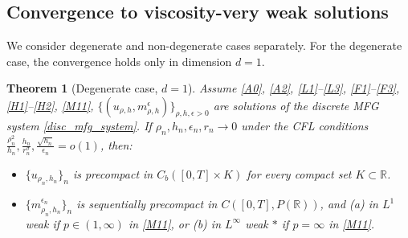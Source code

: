 \documentclass[a4paper,  twoside, 10pt, leqno]{amsart}
\newcommand{\R}{\mathbb{R}}
\newtheorem{thm}{Theorem}[section]
\theoremstyle{remark}
\theoremstyle{definition}
\begin{document}
\subsection{Convergence to viscosity-very weak solutions}

We consider degenerate and non-degenerate cases separately. For the degenerate case, the convergence holds only in dimension $d=1$.  


\begin{thm}[Degenerate case, $d=1$]\label{thm:convergence_MFG}
Assume \ref{A0}, \ref{A2}, \ref{L1}--\ref{L3}, \ref{F1}--\ref{F3}, 
\ref{H1}--\ref{H2}, \ref{M11}, $\{(u_{\rho,h}, m^{\epsilon}_{\rho,h})\}_{\rho,h,\epsilon>0}$ are  solutions of the discrete MFG system
\eqref{disc_mfg_system}. If $\rho_n,h_n,\epsilon_n,r_n\to 0$ under the CFL conditions $\frac{\rho_n^2}{h_n},\frac{h_n}{r_n^{\sigma}},\frac{\sqrt{h_n}}{\epsilon_n}=o(1)$, then:
\begin{itemize}
\item[(i)] $\{u_{\rho_n,h_n}\}_n$ is precompact in  $C_b([0,T]\times K)$ for every compact set $K \subset \R$. 
\item[(ii)] $\{m^{\epsilon_n}_{\rho_n,h_n}\}_n$ is sequentially precompact in $C ( [ 0,T ], P ( \R ) )$, and (a) in $L^1$ weak if $p \in ( 1,\infty )$ in \ref{M11}, or (b) in $L^{\infty}$ weak $*$ if $p= \infty$ in \ref{M11}.

\end{itemize}
\end{thm}
\end{document}
